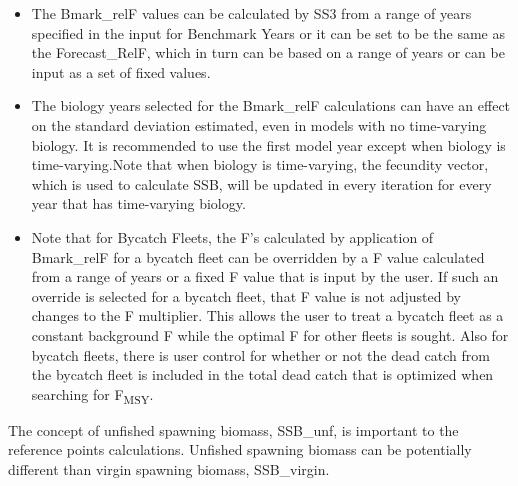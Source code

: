\begin{itemize}
	\item The Bmark\_relF values can be calculated by SS3 from a range of years specified in the input for Benchmark Years or it can be set to be the same as the Forecast\_RelF, which in turn can be based on a range of years or can be input as a set of fixed values.
	
	\item The biology years selected for the Bmark\_relF calculations can have an effect on the standard deviation estimated, even in models with no time-varying biology. It is recommended to use the first model year except when biology is time-varying.Note that when biology is time-varying, the fecundity vector, which is used to calculate SSB, will be updated in every iteration for every year that has time-varying biology.
	
	\item Note that for Bycatch Fleets, the F's calculated by application of Bmark\_relF for a bycatch fleet can be overridden by a F value calculated from a range of years or a fixed F value that is input by the user. If such an override is selected for a bycatch fleet, that F value is not adjusted by changes to the F multiplier. This allows the user to treat a bycatch fleet as a constant background F while the optimal F for other fleets is sought. Also for bycatch fleets, there is user control for whether or not the dead catch from the bycatch fleet is included in the total dead catch that is optimized when searching for F\textsubscript{MSY}.
\end{itemize}

The concept of unfished spawning biomass, SSB\_unf, is important to the reference points calculations. Unfished spawning biomass can be potentially different than virgin spawning biomass, SSB\_virgin.

